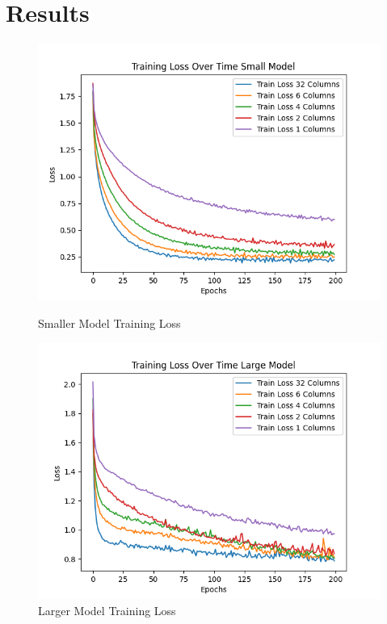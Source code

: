\documentclass{article}
\begin{document}
\section{Results}
\begin{figure}[!htb]
		\includegraphics[width = \linewidth]{figures/train_loss_over_time_small.png}
		\caption{Smaller Model Training Loss}
	\endminipage\hfill
		\includegraphics[width = \linewidth]{figures/loss_over_time_large_model.png}
		\caption{Larger Model Training Loss}
	\endminipage\hfill	
\end{figure}
\end{document}
